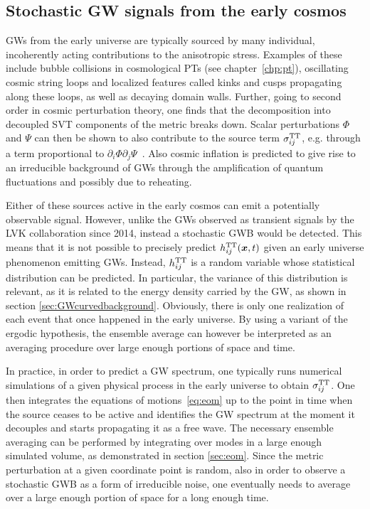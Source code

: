 \subsection{Stochastic GW signals from the early cosmos}\label{sec:stochasticbackgrounds}

\acp{GW} from the early universe are typically sourced by many individual, incoherently acting contributions to the anisotropic stress. Examples of these include bubble collisions in cosmological \acp{PT} (see chapter~\ref{chp:pt}), oscillating cosmic string loops and localized features called kinks and cusps propagating along these loops, as well as  decaying domain walls. Further, going to second order in cosmic perturbation theory, one finds that the decomposition into decoupled \ac{SVT} components of the metric breaks down. Scalar perturbations $\Phi$ and $\Psi$ can then be shown to also contribute to the source term $\sigma_{ij}^{\text{TT}}$, e.g. through a term proportional to $\partial_i \Phi \partial_j \Psi$~\cite{Caprini:2018mtu}. Also cosmic inflation is predicted to give rise to an irreducible background of \acp{GW} through the amplification of quantum fluctuations and possibly due to reheating.

Either of these sources active in the early cosmos can emit a potentially observable signal. However, unlike the \acp{GW} observed as transient signals by the \acs{LVK} collaboration since 2014, instead a stochastic \ac{GWB} would be detected. This means that it is not possible to precisely predict $h_{ij}^{\text{TT}}(\bm{x},t)$ given an early universe phenomenon emitting \acp{GW}. Instead, $h_{ij}^{\text{TT}}$ is a random variable whose statistical distribution can be predicted. In particular, the variance of this distribution is relevant, as it is related to the energy density carried by the \ac{GW}, as shown in section \ref{sec:GWcurvedbackground}. Obviously, there is only one realization of each event that once happened in the early universe. By using a variant of the ergodic hypothesis, the ensemble average can however be interpreted as an averaging procedure over large enough portions of space and time.

In practice, in order to predict a \ac{GW} spectrum, one typically runs numerical simulations of a given physical process in the early universe to obtain $\sigma_{ij}^{\text{TT}}$. One then integrates the equations of motions~\eqref{eq:eom} up to the point in time when the source ceases to be active and identifies the \ac{GW} spectrum at the moment it decouples and starts propagating it as a free wave. The necessary ensemble averaging can be performed by integrating over modes in a large enough simulated volume, as demonstrated in section \ref{sec:eom}. Since the metric perturbation at a given coordinate point is random, also in order to observe a stochastic \ac{GWB} as a form of irreducible noise, one eventually needs to average over a large enough portion of space for a long enough time.

